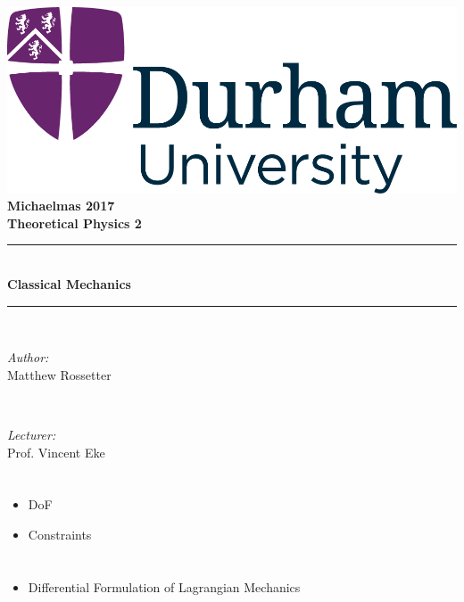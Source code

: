 \documentclass[a4paper,11pt,normalem]{article}
\newcommand{\HRule}{\rule{\linewidth}{0.5mm}}
\begin{document}
{\centering
{\includegraphics[scale=0.5]{../../logo0.png}\hfill{\Large\bfseries Michaelmas 2017}}\\[1.5cm]
{\LARGE\bfseries Theoretical Physics 2}\\[0.5cm]
\HRule \\[0.3cm]
{\huge\bfseries Classical Mechanics}\\[0.1cm]
\HRule \\[1cm]}
\begin{center}
\begin{minipage}{0.4\textwidth}
    \begin{flushleft} \large
        \emph{Author:} \\ Matthew Rossetter
    \end{flushleft}
\end{minipage}~
\begin{minipage}{0.4\textwidth}
    \begin{flushright} \large
        \emph{Lecturer:} \\ Prof. Vincent Eke
    \end{flushright}
\end{minipage}
\end{center}

\section{}\label{lecture-1}
\begin{itemize}
\item DoF
\item Constraints
\end{itemize}

\section{}\label{lecture-2}

\begin{itemize}
\item Differential Formulation of Lagrangian Mechanics
\end{itemize}
\end{document}
